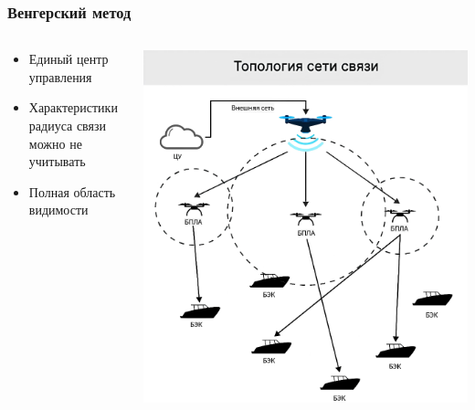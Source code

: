 \documentclass{beamer}
\begin{document}
	\begin{frame}
		\frametitle{Венгерский метод}
		\begin{columns}[T] %
			\begin{column}{0.4\textwidth} %
				\begin{itemize}
					\item Единый центр управления
					\item Характеристики радиуса связи можно не учитывать
					\item Полная область видимости
				\end{itemize}
			\end{column}
			\begin{column}{0.6\textwidth} %
				\centering
				\includegraphics[width=\textwidth,height=0.85\textheight,keepaspectratio]{topology_veng.png}
			\end{column}
		\end{columns}
	\end{frame}
\end{document}
